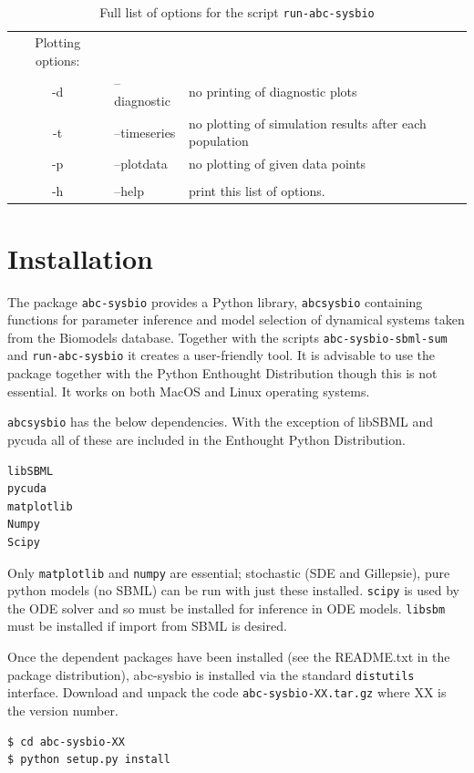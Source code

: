 \documentclass[a4paper]{report}
\begin{document}
\begin{table}[h]
\begin{center}
\begin{tabular}{c l l}
Plotting options: & & \\
-d &      --diagnostic  &   no printing of diagnostic plots \\
-t &      --timeseries &  no plotting of simulation results after each population \\
-p &      --plotdata   &    no plotting of given data points \\
& & \\
-h &      --help &           print this list of options. \\

\end{tabular}
\end{center}
\caption{\rm Full list of options for the script \tt run-abc-sysbio}
\label{default}
\end{table}
\chapter{Installation}
The package \verb$abc-sysbio$ provides a Python library, \verb$abcsysbio$ containing functions for parameter inference and model selection \citep{Toni2009,ABCrejection} of dynamical systems taken from the Biomodels database. Together with the scripts \verb$abc-sysbio-sbml-sum$ and \verb$run-abc-sysbio$ it creates a user-friendly tool.
It is advisable to use the package together with the Python Enthought Distribution though this is not essential. It works on both MacOS and Linux operating systems.

\verb$abcsysbio$ has the below dependencies. With the exception of libSBML and pycuda all of these are included in the Enthought Python Distribution. 
\begin{verbatim}
libSBML
pycuda
matplotlib
Numpy
Scipy
\end{verbatim}
Only  \verb$matplotlib$ and \verb$numpy$ are essential; stochastic (SDE and Gillepsie), pure python models (no SBML) can be run with just these installed. \verb$scipy$ is used by the ODE solver and so must be installed for inference in ODE models. \verb$libsbm$ must be installed if import from SBML is desired. 

Once the dependent packages have been installed (see the README.txt in the package distribution), abc-sysbio is installed via the standard \verb$distutils$ interface. Download and unpack the code \verb$abc-sysbio-XX.tar.gz$ where XX is the version number.
\begin{verbatim}
$ cd abc-sysbio-XX
$ python setup.py install
\end{verbatim}
\end{document}
